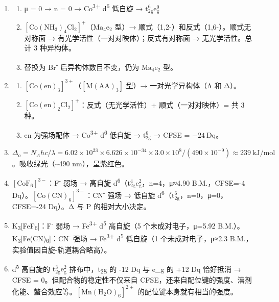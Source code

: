 \documentclass[a4paper,11pt]{ctexart}
\providecommand{\tightlist}{\setlength{\itemsep}{0pt}\setlength{\parskip}{0pt}}
\begin{document}
\begin{enumerate}
\def\labelenumi{\arabic{enumi}.}
\setcounter{enumi}{9}
\item
  \begin{enumerate}
  \def\labelenumii{(\arabic{enumii})}
  \tightlist
  \item
    μ = 0 → n = 0 → Co\textsuperscript{3+} d\textsuperscript{6} 低自旋 → \(\mathrm{t_{2g}^6 e_g^0}\)
  \item
    \(\mathrm{[Co(NH_3)_4Cl_2]^+}\)（\(\mathrm{Ma_4e_2}\) 型）→ 顺式（1,2-）和反式（1,6-）。顺式无对称面 → 有光学活性（一对对映体）；反式有对称面 → 无光学活性。总计 3 种异构体。
  \item
    替换为 Br\textsuperscript{-} 后异构体数目不变，仍为 \(\mathrm{Ma_4e_2}\) 型。
  \end{enumerate}
\item
  \begin{enumerate}
  \def\labelenumii{(\arabic{enumii})}
  \tightlist
  \item
    \([\mathrm{Co(en)_3}]^{3+}\)（\(\mathrm{[M(AA)_3]}\) 型）→ 一对光学异构体（Λ 和 Δ）。
  \item
    \([\mathrm{Co(en)_2Cl_2}]^+\)：反式（无光学活性）+ 顺式（一对对映体）= 共 3 种。
  \item
    en 为强场配体 → Co\textsuperscript{3+} d\textsuperscript{6} 低自旋 → \(\mathrm{t_{2g}^6}\) → CFSE = \(-24\ \mathrm{Dq}\)。
  \end{enumerate}
\item
  \(\Delta_o = N_A hc/\lambda = 6.02\times10^{23} \times 6.626\times10^{-34} \times 3.0\times10^8 / (490\times10^{-9}) \approx 239\ \mathrm{kJ/mol}\)。吸收绿光（\textasciitilde490 nm），呈紫红色。
\item
  \([\mathrm{CoF_6}]^{3-}\)：F\textsuperscript{-} 弱场 → 高自旋 d\textsuperscript{6}（\(\mathrm{t_{2g}^4 e_g^2}\)，n=4，μ≈4.90 B.M.，CFSE=-4 Dq）。\([\mathrm{Co(CN)_6}]^{3-}\)：CN\textsuperscript{-} 强场 → 低自旋 d\textsuperscript{6}（\(\mathrm{t_{2g}^6}\)，n=0，μ=0，CFSE=-24 Dq）。Δ 与 P 的相对大小决定。
\item
  K\textsubscript{3}{[}FeF\textsubscript{6}{]}：F\textsuperscript{-} 弱场 → Fe\textsuperscript{3+} d\textsuperscript{5} 高自旋（5 个未成对电子，μ=5.92 B.M.）。K\textsubscript{3}{[}Fe(CN)\textsubscript{6}{]}：CN\textsuperscript{-} 强场 → Fe\textsuperscript{3+} d\textsuperscript{5} 低自旋（1 个未成对电子，μ≈2.3 B.M.，实验值因自旋-轨道耦合略高）。
\item
  d\textsuperscript{5} 高自旋的 \(\mathrm{t_{2g}^3 e_g^2}\) 排布中，t\textsubscript{2}g 的 -12 Dq 与 e\_g 的 +12 Dq 恰好抵消 → CFSE = 0。但配合物的稳定性不仅来自 CFSE，还来自配位键的强度、溶剂化能、螯合效应等。\([\mathrm{Mn(H_2O)_6}]^{2+}\) 的配位键本身就有相当的强度。
\end{enumerate}
\end{document}
